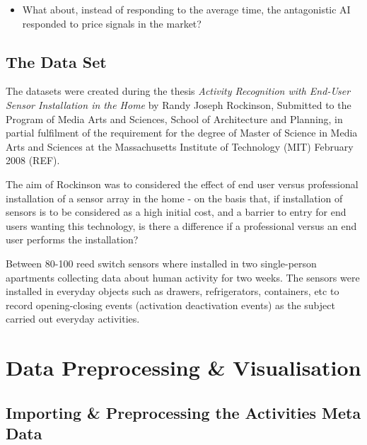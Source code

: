 \documentclass[11pt,]{article}
\providecommand{\tightlist}{%
  \setlength{\itemsep}{0pt}\setlength{\parskip}{0pt}}
\begin{document}
\begin{itemize}
\tightlist
\item
  What about, instead of responding to the average time, the
  antagonistic AI responded to price signals in the market?
\end{itemize}

\hypertarget{the-data-set}{%
\subsection{The Data Set}\label{the-data-set}}

The datasets were created during the thesis \emph{Activity Recognition
with End-User Sensor Installation in the Home} by Randy Joseph
Rockinson, Submitted to the Program of Media Arts and Sciences, School
of Architecture and Planning, in partial fulfilment of the requirement
for the degree of Master of Science in Media Arts and Sciences at the
Massachusetts Institute of Technology (MIT) February 2008 (REF).

The aim of Rockinson was to considered the effect of end user versus
professional installation of a sensor array in the home - on the basis
that, if installation of sensors is to be considered as a high initial
cost, and a barrier to entry for end users wanting this technology, is
there a difference if a professional versus an end user performs the
installation?

Between 80-100 reed switch sensors where installed in two single-person
apartments collecting data about human activity for two weeks. The
sensors were installed in everyday objects such as drawers,
refrigerators, containers, etc to record opening-closing events
(activation deactivation events) as the subject carried out everyday
activities.

\pagebreak

\hypertarget{data-preprocessing-visualisation}{%
\section{Data Preprocessing \&
Visualisation}\label{data-preprocessing-visualisation}}

\hypertarget{importing-preprocessing-the-activities-meta-data}{%
\subsection{Importing \& Preprocessing the Activities Meta
Data}\label{importing-preprocessing-the-activities-meta-data}}
\end{document}
